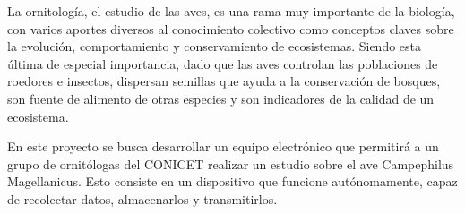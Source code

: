 La ornitología, el estudio de las aves, es una rama muy importante de la biología, con varios aportes diversos al conocimiento colectivo como conceptos claves sobre la evolución, comportamiento y conservamiento de ecosistemas. Siendo esta última de especial importancia, dado que las aves controlan las poblaciones de roedores e insectos, dispersan semillas que ayuda a la conservación de bosques, son fuente de alimento de otras especies y son indicadores de la calidad de un ecosistema.


En este proyecto se busca desarrollar un equipo electrónico que permitirá a un grupo de ornitólogas del CONICET realizar un estudio sobre el ave Campephilus Magellanicus. Esto consiste en un dispositivo que funcione autónomamente, capaz de recolectar datos, almacenarlos y transmitirlos.


